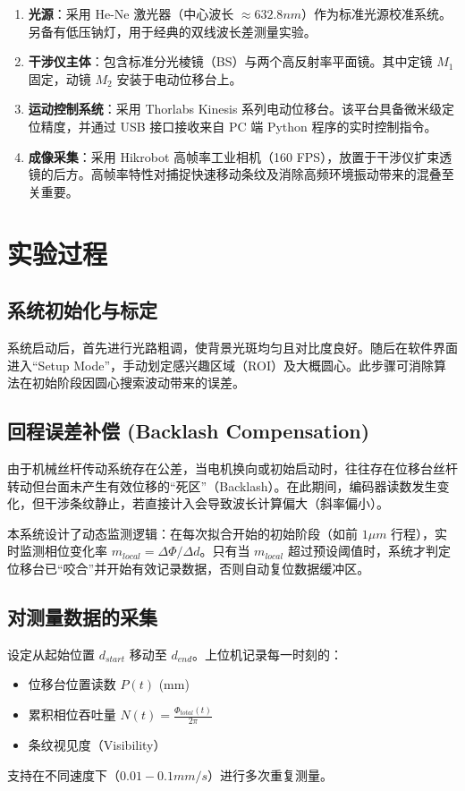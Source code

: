 \documentclass[twocolumn, a4paper, 10pt]{article}
\begin{document}
\begin{enumerate}
    \item \textbf{光源}：采用 He-Ne 激光器（中心波长 $\approx 632.8 nm$）作为标准光源校准系统。另备有低压钠灯，用于经典的双线波长差测量实验。
    \item \textbf{干涉仪主体}：包含标准分光棱镜（BS）与两个高反射率平面镜。其中定镜 $M_1$ 固定，动镜 $M_2$ 安装于电动位移台上。
    \item \textbf{运动控制系统}：采用 Thorlabs Kinesis 系列电动位移台。该平台具备微米级定位精度，并通过 USB 接口接收来自 PC 端 Python 程序的实时控制指令。
    \item \textbf{成像采集}：采用 Hikrobot 高帧率工业相机（160 FPS），放置于干涉仪扩束透镜的后方。高帧率特性对捕捉快速移动条纹及消除高频环境振动带来的混叠至关重要。
\end{enumerate}

\section{实验过程}
\subsection{系统初始化与标定}
系统启动后，首先进行光路粗调，使背景光斑均匀且对比度良好。随后在软件界面进入“Setup Mode”，手动划定感兴趣区域（ROI）及大概圆心。此步骤可消除算法在初始阶段因圆心搜索波动带来的误差。

\subsection{回程误差补偿 (Backlash Compensation)}
由于机械丝杆传动系统存在公差，当电机换向或初始启动时，往往存在位移台丝杆转动但台面未产生有效位移的“死区”（Backlash）。在此期间，编码器读数发生变化，但干涉条纹静止，若直接计入会导致波长计算偏大（斜率偏小）。

本系统设计了动态监测逻辑：在每次拟合开始的初始阶段（如前 $1 \mu m$ 行程），实时监测相位变化率 $m_{local} = \Delta \Phi / \Delta d$。只有当 $m_{local}$ 超过预设阈值时，系统才判定位移台已“咬合”并开始有效记录数据，否则自动复位数据缓冲区。

\subsection{对测量数据的采集}
设定从起始位置 $d_{start}$ 移动至 $d_{end}$。上位机记录每一时刻的：
\begin{itemize}
    \item 位移台位置读数 $P(t)$ (mm)
    \item 累积相位吞吐量 $N(t) = \frac{\Phi_{total}(t)}{2\pi}$
    \item 条纹视见度（Visibility）
\end{itemize}
支持在不同速度下（$0.01 - 0.1 mm/s$）进行多次重复测量。
\end{document}
